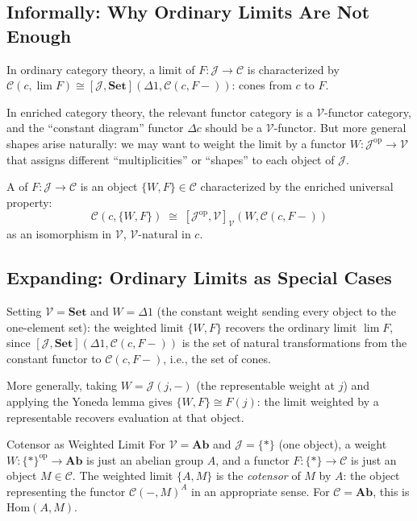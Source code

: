 \subsection{Informally: Why Ordinary Limits Are Not Enough}

In ordinary category theory, a limit of $F : \mathcal{J} \to \mathcal{C}$ is
characterized by $\mathcal{C}(c, \lim F) \cong [\mathcal{J}, \mathbf{Set}](\Delta 1,
\mathcal{C}(c, F-))$: cones from $c$ to $F$.

In enriched category theory, the relevant functor category is a
$\mathcal{V}$-functor category, and the ``constant diagram'' functor $\Delta c$
should be a $\mathcal{V}$-functor. But more general shapes arise naturally: we
may want to weight the limit by a functor $W : \mathcal{J}^{\mathrm{op}} \to
\mathcal{V}$ that assigns different ``multiplicities'' or ``shapes'' to each
object of $\mathcal{J}$.

A  of $F : \mathcal{J} \to \mathcal{C}$ is an object
$\{W, F\} \in \mathcal{C}$ characterized by the enriched universal property:
\begin{equation*}
  \mathcal{C}(c, \{W, F\}) \;\cong\; [\mathcal{J}^{\mathrm{op}}, \mathcal{V}]_\mathcal{V}(W, \mathcal{C}(c, F-))
\end{equation*}
as an isomorphism in $\mathcal{V}$, $\mathcal{V}$-natural in $c$.

\subsection{Expanding: Ordinary Limits as Special Cases}

Setting $\mathcal{V} = \mathbf{Set}$ and $W = \Delta 1$ (the constant weight
sending every object to the one-element set): the weighted limit $\{W, F\}$
recovers the ordinary limit $\lim F$, since $[\mathcal{J}, \mathbf{Set}](\Delta 1,
\mathcal{C}(c, F-))$ is the set of natural transformations from the constant
functor to $\mathcal{C}(c, F-)$, i.e., the set of cones.

More generally, taking $W = \mathcal{J}(j, -)$ (the representable weight at $j$)
and applying the Yoneda lemma gives $\{W, F\} \cong F(j)$: the limit weighted
by a representable recovers evaluation at that object.

\begin{example}{Cotensor as Weighted Limit}
For $\mathcal{V} = \mathbf{Ab}$ and $\mathcal{J} = \{*\}$ (one object), a
weight $W : \{*\}^{\mathrm{op}} \to \mathbf{Ab}$ is just an abelian group $A$,
and a functor $F : \{*\} \to \mathcal{C}$ is just an object $M \in \mathcal{C}$.
The weighted limit $\{A, M\}$ is the \emph{cotensor} of $M$ by $A$: the object
representing the functor $\mathcal{C}(-, M)^A$ in an appropriate sense. For
$\mathcal{C} = \mathbf{Ab}$, this is $\mathrm{Hom}(A, M)$.
\end{example}

